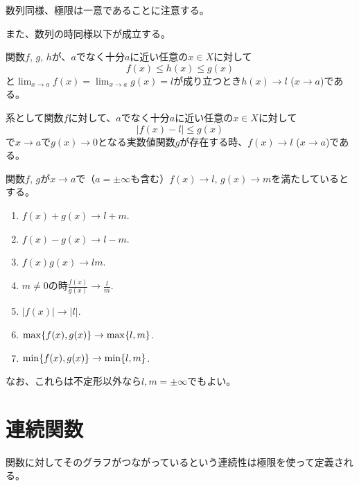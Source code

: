 数列同様、極限は一意であることに注意する。

また、数列の時同様以下が成立する。

\begin{proposition}[はさみうちの原理]
関数$f$, $g$, $h$が、$a$でなく十分$a$に近い任意の$x \in X$に対して
$$
f(x) \le h(x) \le g(x)
$$
と$\lim_{x \to a}f(x) = \lim_{x \to a}g(x) = l$が成り立つとき$h(x) \to l$ ($x \to a$)である。

系として関数$f$に対して、$a$でなく十分$a$に近い任意の$x \in X$に対して
$$
|f(x)-l| \le g(x)
$$
で$x \to a$で$g(x) \to 0$となる実数値関数$g$が存在する時、$f(x) \to l$ ($x \to a$)である。
\end{proposition}

\begin{proposition}[極限と演算]
関数$f$, $g$が$x \to a$で（$a = \pm \infty$も含む）$f(x) \to l$, $g(x) \to m$を満たしているとする。
\begin{enumerate}
\item
$f(x)+g(x) \to l+m$.
\item
$f(x)-g(x) \to l-m$.
\item
$f(x)g(x) \to l m$.
\item
$m \ne 0$の時$\frac{f(x)}{g(x)} \to \frac{l}{m}$.
\item
$|f(x)| \to |l|$.
\item
$\max\{ f(x), g(x) \} \to \max\{ l, m \}$.
\item
$\min\{ f(x), g(x) \} \to \min\{ l, m \}$.
\end{enumerate}
なお、これらは不定形以外なら$l, m = \pm \infty$でもよい。
\end{proposition}

\begin{definition}[片側極限]
\end{definition}

\begin{proposition}
\end{proposition}

\section{連続関数}

関数に対してそのグラフがつながっているという連続性は極限を使って定義される。

